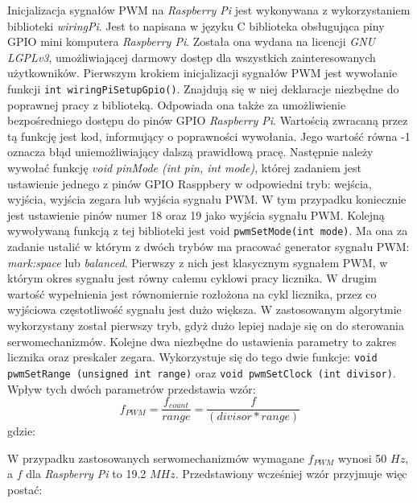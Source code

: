Inicjalizacja sygnałów PWM na \textit{Raspberry Pi} jest wykonywana z wykorzystaniem biblioteki \textit{wiringPi}. Jest to napisana w języku C biblioteka obsługująca piny GPIO mini komputera \textit{Raspberry Pi}. Została ona wydana na licencji \textit{GNU LGPLv3}, umożliwiającej darmowy dostęp dla wszystkich zainteresowanych użytkowników. Pierwszym krokiem inicjalizacji sygnałów PWM jest wywołanie funkcji \texttt{int wiringPiSetupGpio()}. Znajdują się w niej deklaracje niezbędne do poprawnej pracy z biblioteką. Odpowiada ona także za umożliwienie bezpośredniego dostępu do pinów GPIO \textit{Raspberry Pi}. Wartością zwracaną przez tą funkcję jest kod, informujący o poprawności wywołania. Jego wartość równa -1 oznacza błąd uniemożliwiający dalszą prawidłową pracę. Następnie należy wywołać funkcję \textit{void pinMode (int pin, int mode)}, której zadaniem jest ustawienie jednego z pinów GPIO Rasppbery w odpowiedni tryb: wejścia, wyjścia, wyjścia zegara lub wyjścia sygnału PWM. W tym przypadku koniecznie jest ustawienie pinów numer 18 oraz 19 jako wyjścia sygnału PWM. Kolejną wywoływaną funkcją z tej biblioteki jest void \texttt{pwmSetMode(int mode)}. Ma ona za zadanie ustalić w którym z dwóch trybów ma pracować generator sygnału PWM: \textit{mark:space} lub \textit{balanced}. Pierwszy z nich jest klasycznym sygnałem PWM, w którym okres sygnału jest równy całemu cyklowi pracy licznika. W drugim wartość wypełnienia jest równomiernie rozłożona na cykl licznika, przez co wyjściowa częstotliwość sygnału jest dużo większa. W zastosowanym algorytmie wykorzystany został pierwszy tryb, gdyż dużo lepiej nadaje się on do sterowania serwomechanizmów. Kolejne dwa niezbędne do ustawienia parametry to zakres licznika oraz preskaler zegara. Wykorzystuje się do tego dwie funkcje: \texttt{void pwmSetRange (unsigned int range)} oraz \texttt{void pwmSetClock (int divisor)}. Wpływ tych dwóch parametrów przedstawia wzór:
\begin{equation}
f_{PWM} = \frac{f_{count}}{range} = \frac{f}{(divisor * range)}
\label{eq:hard_pwm}
\end{equation}
gdzie:
\begin{equationDescriptor}
\end{equationDescriptor}
W przypadku zastosowanych serwomechanizmów wymagane $f_{PWM}$ wynosi 50 $Hz$, a $f$ dla \textit{Raspberry Pi} to 19.2 $MHz$. Przedstawiony wcześniej wzór przyjmuje więc postać:
